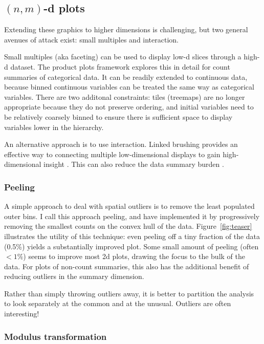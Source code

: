 \documentclass[journal]{vgtc}                %
\begin{document}
\subsection{\texorpdfstring{$(n, m)$}{(n, m)}-d plots}
\label{sub:nd-plots}

Extending these graphics to higher dimensions is challenging, but two general avenues of attack exist: small multiples and interaction.

Small multiples (aka faceting) can be used to display low-d slices through a high-d dataset. The product plots \citep{me:prodplots} framework explores this in detail for count summaries of categorical data. It can be readily extended to continuous data, because binned continuous variables can be treated the same way as categorical variables. There are two additonal constraints: tiles (treemaps) are no longer appropriate because they do not preserve ordering, and initial variables need to be relatively coarsely binned to ensure there is sufficient space to display variables lower in the hierarchy.

An alternative approach is to use interaction. Linked brushing provides an effective way to connecting multiple low-dimensional displays to gain high-dimensional insight \citep{liu:2013,swayne:2003}. This can also reduce the data summary burden \citep{heer:2012}.

\subsubsection{Peeling}
\label{sub:peeling}

A simple approach to deal with spatial outliers is to remove the least populated outer bins. I call this approach peeling, and have implemented it by progressively removing the smallest counts on the convex hull of the data. Figure~\ref{fig:teaser} illustrates the utility of this technique: even peeling off a tiny fraction of the data (0.5\%) yields a substantially improved plot. Some small amount of peeling (often $< 1\%$) seems to improve most 2d plots, drawing the focus to the bulk of the data. For plots of non-count summaries, this also has the additional benefit of reducing outliers in the summary dimension. 

Rather than simply throwing outliers away, it is better to partition the analysis to look separately at the common and at the unusual. Outliers are often interesting!

\subsubsection{Modulus transformation}
\label{sub:mt}
\end{document}
